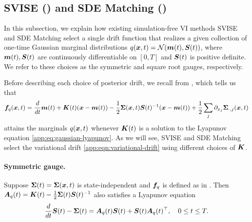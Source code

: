 
\subsection{SVISE (\citet{course2023state}) and SDE Matching (\citet{bartosh2025sde})}\label{app:subsec:svise-sde-compare}

In this subsection, we explain how existing simulation-free VI methods SVISE \cite{course2023state, course2023amortized} and SDE Matching \cite{bartosh2025sde} select a single drift function that realizes a given collection of one-time Gaussian marginal distributions $q(\boldsymbol{x}, t) = \mathcal{N}(\boldsymbol{m}(t), \boldsymbol{S}(t))$, where $\boldsymbol{m}(t), \boldsymbol{S}(t)$ are continuously differentiable on $[0, T]$ and $\boldsymbol{S}(t)$ is positive definite. 
We refer to these choices as the symmetric and square root gauges, respectively.

Before describing each choice of posterior drift, we recall  from , which tells us that
\begin{equation}\label{app:eqn:variational-drift}
\boldsymbol{f}_q(\boldsymbol{x}, t) = \frac{d}{dt}\boldsymbol{m}(t) + \boldsymbol{K}(t)(\boldsymbol{x}-\boldsymbol{m}(t)) - \frac{1}{2}\boldsymbol{\Sigma}(\boldsymbol{x},t)\boldsymbol{S}(t)^{-1}(\boldsymbol{x}-\boldsymbol{m}(t)) + \frac{1}{2}\sum_j \partial_{x_j}\boldsymbol{\Sigma}_{\cdot,j}(\boldsymbol{x},t)
\end{equation}
attains the marginals $q(\boldsymbol{x}, t)$ whenever $\boldsymbol{K}(t)$ is a solution to the Lyapunov equation \cref{app:eq:gaussian-lyapunov}.
As we will see, SVISE and SDE Matching select the variational drift \cref{app:eqn:variational-drift} using different choices of $\boldsymbol{K}$.

\paragraph{Symmetric gauge.}
Suppose $\boldsymbol{\Sigma}(t) = \boldsymbol{\Sigma}(\boldsymbol{x}, t)$ is state-independent and $\boldsymbol{f}_q$ is defined as in . 
Then  $\boldsymbol{A}_q(t) = \boldsymbol{K}(t) - \frac{1}{2}\boldsymbol{\Sigma}(t)\boldsymbol{S}(t)^{-1}$ also satisfies a Lyapunov equation
\begin{equation}\label{eqn:course-nair}
    \frac{d}{dt} \boldsymbol{S}(t) - \boldsymbol{\Sigma}(t)  = \boldsymbol{A}_q(t)\boldsymbol{S}(t) + \boldsymbol{S}(t) \boldsymbol{A}_q(t)^\top, \quad 0 \leq t \leq T.
\end{equation}

